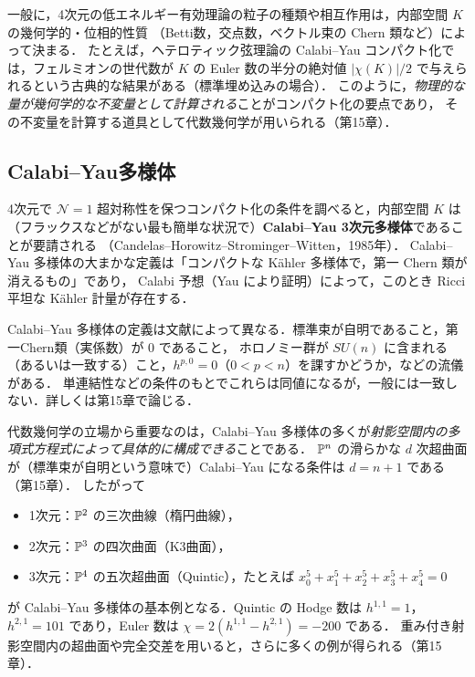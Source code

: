 一般に，4次元の低エネルギー有効理論の粒子の種類や相互作用は，内部空間 $K$ の幾何学的・位相的性質
（Betti数，交点数，ベクトル束の Chern 類など）によって決まる．
たとえば，ヘテロティック弦理論の Calabi--Yau コンパクト化では，フェルミオンの世代数が $K$ の Euler 数の半分の絶対値 $|\chi(K)|/2$
で与えられるという古典的な結果がある（標準埋め込みの場合）．
このように，\emph{物理的な量が幾何学的な不変量として計算される}ことがコンパクト化の要点であり，
その不変量を計算する道具として代数幾何学が用いられる（第15章）．

\subsection{Calabi--Yau多様体}

4次元で $\mathcal N=1$ 超対称性を保つコンパクト化の条件を調べると，内部空間 $K$ は
（フラックスなどがない最も簡単な状況で）\textbf{Calabi--Yau 3次元多様体}であることが要請される
（Candelas--Horowitz--Strominger--Witten，1985年）．
Calabi--Yau 多様体の大まかな定義は「コンパクトな Kähler 多様体で，第一 Chern 類が消えるもの」であり，
Calabi 予想（Yau により証明）によって，このとき Ricci 平坦な Kähler 計量が存在する．

\begin{note}
Calabi--Yau 多様体の定義は文献によって異なる．標準束が自明であること，第一Chern類（実係数）が $0$ であること，
ホロノミー群が $SU(n)$ に含まれる（あるいは一致する）こと，$h^{p,0}=0$（$0<p<n$）を課すかどうか，などの流儀がある．
単連結性などの条件のもとでこれらは同値になるが，一般には一致しない．詳しくは第15章で論じる．
\end{note}

代数幾何学の立場から重要なのは，Calabi--Yau 多様体の多くが\emph{射影空間内の多項式方程式によって具体的に構成できる}ことである．
$\mathbb{P}^n$ の滑らかな $d$ 次超曲面が（標準束が自明という意味で）Calabi--Yau になる条件は $d=n+1$ である（第15章）．
したがって
\begin{itemize}
  \item 1次元：$\mathbb{P}^2$ の三次曲線（楕円曲線），
  \item 2次元：$\mathbb{P}^3$ の四次曲面（K3曲面），
  \item 3次元：$\mathbb{P}^4$ の五次超曲面（Quintic），たとえば $x_0^5+x_1^5+x_2^5+x_3^5+x_4^5=0$
\end{itemize}
が Calabi--Yau 多様体の基本例となる．Quintic の Hodge 数は $h^{1,1}=1$，$h^{2,1}=101$ であり，Euler 数は
$\chi=2(h^{1,1}-h^{2,1})=-200$ である．
重み付き射影空間内の超曲面や完全交差を用いると，さらに多くの例が得られる（第15章）．

